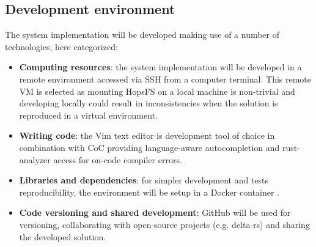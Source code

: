 \subsection{Development environment}
The system implementation will be developed making use of a number of technologies, here categorized:
\begin{itemize}
    \item \textbf{Computing resources}: the system implementation will be developed in a remote environment accessed via \gls{SSH} from a computer terminal. This remote \gls{VM} is selected as mounting \gls{HopsFS} on a local machine is non-trivial and developing locally could result in inconsistencies when the solution is reproduced in a virtual environment.
    \item \textbf{Writing code}: the Vim \cite{WelcomeHomeVim} text editor is development tool of choice in combination with \gls{CoC} \cite{NeoclideCocnvim2024} providing language-aware autocompletion and rust-analyzer \cite{fannFannheywardCocrustanalyzer2024} access for on-code compiler errors. 
    \item \textbf{Libraries and dependencies}: for simpler development and tests reproducibility, the environment will be setup in a Docker container \cite{DockerBuild0200}.
    \item \textbf{Code versioning and shared development}: GitHub \cite{GitHub} will be used for versioning, collaborating with open-source projects (e.g. delta-rs) and sharing the developed solution.
\end{itemize}

 